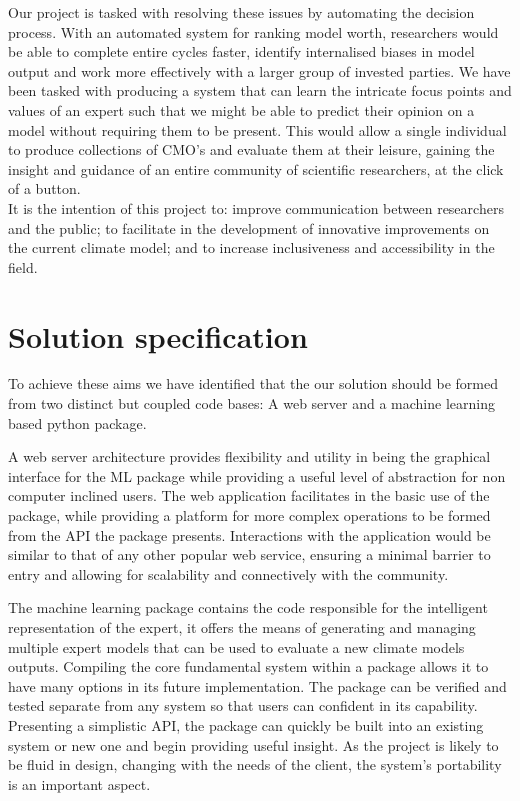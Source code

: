 \documentclass{ecmm427_assignment}
\begin{document}
Our project is tasked with resolving these issues by automating the decision process. With an automated system for ranking model worth, researchers would be able to complete entire cycles faster, identify internalised biases in model output and work more effectively with a larger group of invested parties. We have been tasked with producing a system that can learn the intricate focus points and values of an expert such that we might be able to predict their opinion on a model without requiring them to be present. This would allow a single individual to produce collections of CMO's and evaluate them at their leisure, gaining the insight and guidance of an entire community of scientific researchers, at the click of a button.\\

\noindent It is the intention of this project to: improve communication between researchers and the public; to facilitate in the development of innovative improvements on the current climate model; and to increase inclusiveness and accessibility in the field.

\section{Solution specification}

To achieve these aims we have identified that the our solution should be formed from two distinct but coupled code bases: A web server and a machine learning based python package.

A web server architecture provides flexibility and utility in being the graphical interface for the ML package while providing a useful level of abstraction for non computer inclined users. The web application facilitates in the basic use of the package, while providing a platform for more complex operations to be formed from the API the package presents. Interactions with the application would be similar to that of any other popular web service, ensuring a minimal barrier to entry and allowing for scalability and connectively with the community.

The machine learning package contains the code responsible for the intelligent representation of the expert, it offers the means of generating and managing multiple expert models that can be used to evaluate a new climate models outputs. Compiling the core fundamental system within a package allows it to have many options in its future implementation. The package can be verified and tested separate from any system so that users can confident in its capability. Presenting a simplistic API, the package can quickly be built into an existing system or new one and begin providing useful insight. As the project is likely to be fluid in design, changing with the needs of the client, the system's portability is an important aspect.
\end{document}
